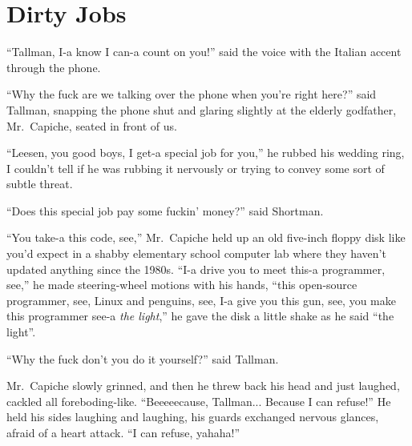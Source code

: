 \documentclass[oneside]{book}
\begin{document}
%
%
%
%


\chapter{Dirty Jobs}

``Tallman, I-a know I can-a count on you!'' said the voice with the Italian
accent through the phone.

``Why the fuck are we talking over the phone when you're right here?'' said Tallman,
snapping the phone shut and glaring slightly at the elderly godfather, Mr.~Capiche,
seated in front of us.

``Leesen, you good boys, I get-a special job for you,'' he rubbed his wedding ring,
I couldn't tell if he was rubbing it nervously or trying to convey some sort of
subtle threat.

``Does this special job pay some fuckin' money?'' said Shortman.

``You take-a this code, see,'' Mr.~Capiche held up an old five-inch floppy disk
like you'd expect in a shabby elementary school computer lab where
they haven't updated anything since the 1980s.  ``I-a drive you to meet this-a
programmer, see,'' he made steering-wheel motions with his hands, ``this open-source
programmer, see, Linux and penguins, see, I-a give you
this gun, see, you make this programmer see-a \emph{the light},'' he gave the disk
a little shake as he said ``the light''.

``Why the fuck don't you do it yourself?'' said Tallman.

Mr.~Capiche slowly grinned, and then he threw back his head and just laughed,
cackled all foreboding-like.  ``Beeeeecause, Tallman...  Because I can refuse!''
He held his sides laughing and laughing, his guards exchanged nervous glances,
afraid of a heart attack.  ``I can refuse, yahaha!''
\end{document}
